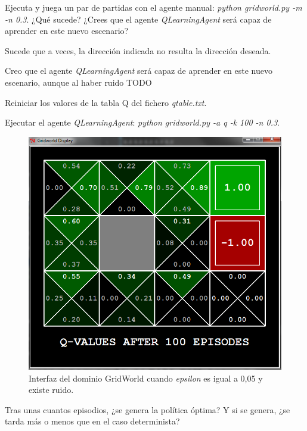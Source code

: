 \documentclass[11pt]{exam}
\begin{document}
\begin{questions}

{ \question Ejecuta y juega un par de partidas con el agente manual: \textit{python gridworld.py -m -n 0.3}. ¿Qué sucede? ¿Crees que el agente \textit{QLearningAgent} será capaz de aprender en este nuevo escenario?
}

Sucede que a veces, la dirección indicada no resulta la dirección deseada.

Creo que el agente \textit{QLearningAgent} será capaz de aprender en este nuevo escenario, aunque al haber ruido TODO

{ \question Reiniciar los valores de la tabla Q del fichero \textit{qtable.txt}.}

{ \question Ejecutar el agente \textit{QLearningAgent}: \textit{python gridworld.py -a q -k 100 -n 0.3}.}

\begin{figure}[h]
	\centering
	\includegraphics[scale=0.5]{image_5}
	\caption{Interfaz del dominio GridWorld cuando \textit{epsilon} es igual a 0,05 y existe ruido.}
	\label{image_5}
\end{figure}

{ \question Tras unas cuantos episodios, ¿se genera la política óptima? Y si se genera, ¿se tarda más o menos que en el caso determinista?
}

\end{questions}
\end{document}
